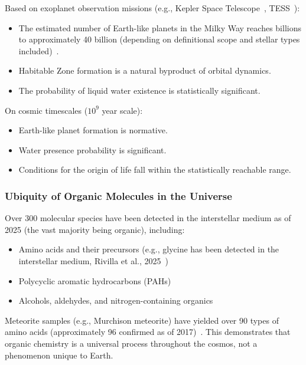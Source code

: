 \documentclass[aps,prd,twocolumn,superscriptaddress,nofootinbib]{revtex4-2}
\begin{document}
Based on exoplanet observation missions (e.g., Kepler Space Telescope~\cite{NASA_Kepler}, TESS~\cite{NASA_TESS}):

\begin{itemize}
  \item The estimated number of Earth-like planets in the Milky Way reaches billions to approximately 40 billion (depending on definitional scope and stellar types included)~\cite{Petigura2013}.
  \item Habitable Zone formation is a natural byproduct of orbital dynamics.
  \item The probability of liquid water existence is statistically significant.
\end{itemize}

On cosmic timescales ($10^{9}$ year scale):

\begin{itemize}
  \item Earth-like planet formation is normative.
  \item Water presence probability is significant.
  \item Conditions for the origin of life fall within the statistically reachable range.
\end{itemize}

\subsubsection{Ubiquity of Organic Molecules in the Universe}\label{sec:organic-molecules}

Over 300 molecular species have been detected in the interstellar medium as of 2025 (the vast majority being organic), including:

\begin{itemize}
  \item Amino acids and their precursors (e.g., glycine has been detected in the interstellar medium, Rivilla et al., 2025~\cite{Rivilla2025})
  \item Polycyclic aromatic hydrocarbons (PAHs)
  \item Alcohols, aldehydes, and nitrogen-containing organics
\end{itemize}

Meteorite samples (e.g., Murchison meteorite) have yielded over 90 types of amino acids (approximately 96 confirmed as of 2017)~\cite{Glavin2021}. This demonstrates that organic chemistry is a universal process throughout the cosmos, not a phenomenon unique to Earth.
\end{document}

